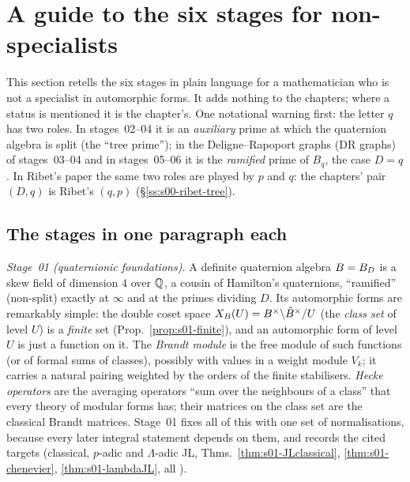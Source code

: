 \section{A guide to the six stages for non-specialists}\label{ss:s00-guide}
This section retells the six stages in plain language for a mathematician who is not a specialist in automorphic forms. It
adds nothing to the chapters; where a status is mentioned it is the chapter's. One notational warning first: the letter $q$
has two roles. In stages~02--04 it is an \emph{auxiliary} prime at which the quaternion algebra is split (the ``tree prime'');
in the Deligne--Rapoport graphs (DR graphs) of stages~03--04 and in stages~05--06 it is the \emph{ramified} prime of $B_q$, the case $D=q$. In Ribet's paper
\cite{Ri90} the same two roles are played by $p$ and $q$: the chapters' pair $(D,q)$ is Ribet's $(q,p)$ (\S\ref{ss:s00-ribet-tree}).

\subsection*{The stages in one paragraph each}
\emph{Stage~01 (quaternionic foundations).} A definite quaternion algebra $B=B_D$ is a skew field of
dimension $4$ over $\mathbb{Q}$, a cousin of Hamilton's quaternions, ``ramified'' (non-split) exactly at $\infty$ and at the primes
dividing $D$. Its automorphic forms are remarkably simple: the double coset space $X_B(U)=B^\times\backslash\hat B^\times/U$
(the \emph{class set} of level $U$) is a \emph{finite} set (Prop.~\ref{prop:s01-finite}), and an automorphic form of level $U$
is just a function on it. The \emph{Brandt module} is the free module of such functions (or of formal sums of classes),
possibly with values in a weight module $V_k$; it carries a natural pairing weighted by the orders of the finite
stabilisers. \emph{Hecke operators} are the averaging operators ``sum over the neighbours of a class'' that every theory of
modular forms has; their matrices on the class set are the classical Brandt matrices. Stage~01 fixes all of this with one set of
normalisations, because every later integral statement depends on them, and records the cited targets (classical, $p$-adic
and $\Lambda$-adic JL, Thms.~\ref{thm:s01-JLclassical}, \ref{thm:s01-chenevier}, \ref{thm:s01-lambdaJL}, all \stcited).


